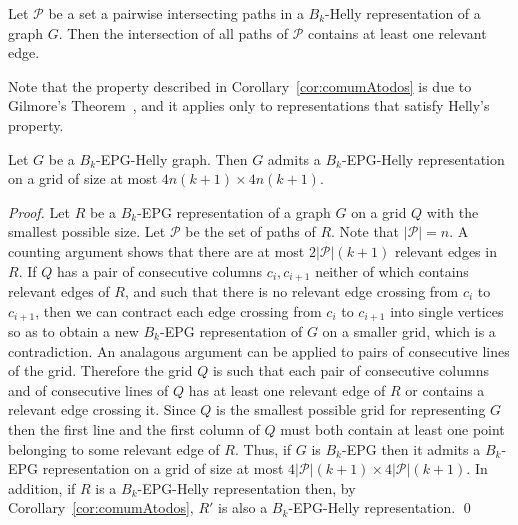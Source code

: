\documentclass[runningheads]{llncs}
\begin{document}
\begin{coro}\label{cor:comumAtodos}
Let ${\mathcal P}$ be a set a pairwise intersecting paths in a $B_k$-Helly representation of a graph $G$. Then the intersection of all paths of  ${\mathcal P}$ contains at least one relevant edge.
\end{coro}

Note that the property described in Corollary~\ref{cor:comumAtodos} is due to Gilmore's Theorem~\cite{bergeDuchet1975}, and it applies only to representations that satisfy Helly's property.

\medskip




\begin{lemma}\label{lem:gridPolinomial}
Let $G$ be a $B_k$-EPG-Helly graph. Then $G$ admits a $B_k$-EPG-Helly representation on a grid of size at most $4n(k+1) \times 4n(k+1)$.
\end{lemma}
\begin{proof}
Let $R$ be a $B_k$-EPG representation of a graph $G$ on a grid $Q$ with the smallest possible size.
Let $\mathcal{P}$ be the set of paths of $R$. Note that $|\mathcal{P}|=n$.
A counting argument shows that there are at most $2|\mathcal{P}|(k+1)$ relevant edges in $R$. 
 If $Q$ has a pair of consecutive columns $c_i,c_{i+1}$ neither of which contains relevant edges of $R$, and such that there is no relevant edge crossing from $c_i$ to $c_{i+1}$, then we can contract each edge crossing from $c_i$ to $c_{i+1}$ into single vertices so as to obtain a new  $B_k$-EPG representation of $G$ on a smaller grid, which is a contradiction. An analagous argument can be applied to pairs of consecutive lines of the grid.
 Therefore the grid $Q$ is such that each pair of consecutive columns and of consecutive lines of $Q$  has at least one relevant edge of $R$ or contains a relevant edge crossing it.  
  Since $Q$ is the smallest possible grid for representing $G$ then the first line and the first column of $Q$ must both contain at least one point belonging to some relevant edge of $R$. 
Thus, if $G$ is $B_k$-EPG then it admits a $B_k$-EPG representation on a grid of size at most $4|\mathcal{P}|(k+1) \times 4|\mathcal{P}|(k+1)$.
In addition, if $R$ is a $B_k$-EPG-Helly representation then, by Corollary~\ref{cor:comumAtodos},  $R'$ is also a  $B_k$-EPG-Helly representation.
\qed
\end{proof}
\end{document}
